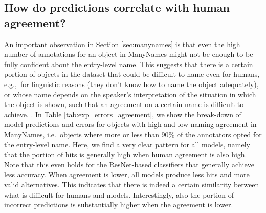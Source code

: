 \fi 



\subsection{How do predictions correlate with human agreement?}

An important observation in Section \ref{sec:manynames} is that even the high number of annotations for an object in ManyNames might not be enough to be fully confident about the entry-level name.
This suggests that there is a certain portion of objects in the dataset that could be difficult to name even for humans, e.g.,~for linguistic reasons (they don't know how to name the object adequately), or whose name depends on the speaker's interpretation of the situation in which the object is shown, such that an agreement on a certain name is difficult to achieve. .
In Table \ref{tab:exp_errors_agreement}, we show the break-down of model predictions and errors for objects with high and low naming agreement in ManyNames, i.e.\ objects where more or less than 90\% of the annotators opted for the entry-level name. 
Here, we find a very clear pattern for all models, namely that the portion of hits is generally high when human agreement is also high.
Note that this even holds for the ResNet-based classifiers that generally achieve less accuracy.
When agreement is lower, all models produce less hits and more valid alternatives. 
This indicates that there is indeed a certain similarity between what is difficult for humans and models.
Interestingly, also the portion of incorrect predictions is substantially higher when the agreement is lower. 












